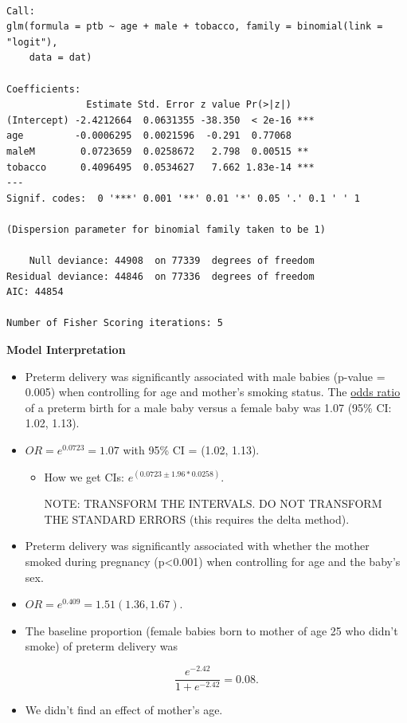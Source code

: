 \documentclass[
  letterpaper,
  DIV=11,
  numbers=noendperiod]{scrreprt}
\begin{document}
\begin{verbatim}

Call:
glm(formula = ptb ~ age + male + tobacco, family = binomial(link = "logit"), 
    data = dat)

Coefficients:
              Estimate Std. Error z value Pr(>|z|)    
(Intercept) -2.4212664  0.0631355 -38.350  < 2e-16 ***
age         -0.0006295  0.0021596  -0.291  0.77068    
maleM        0.0723659  0.0258672   2.798  0.00515 ** 
tobacco      0.4096495  0.0534627   7.662 1.83e-14 ***
---
Signif. codes:  0 '***' 0.001 '**' 0.01 '*' 0.05 '.' 0.1 ' ' 1

(Dispersion parameter for binomial family taken to be 1)

    Null deviance: 44908  on 77339  degrees of freedom
Residual deviance: 44846  on 77336  degrees of freedom
AIC: 44854

Number of Fisher Scoring iterations: 5
\end{verbatim}

\textbf{Model Interpretation}

\begin{itemize}
\item
  Preterm delivery was significantly associated with male babies
  (p-value = 0.005) when controlling for age and mother's smoking
  status. The \ul{odds ratio} of a preterm birth for a male baby versus
  a female baby was 1.07 (95\% CI: 1.02, 1.13).
\item
  \(OR = e^{0.0723} = 1.07\) with 95\% CI = (1.02, 1.13).

  \begin{itemize}
  \item
    How we get CIs: \(e^{(0.0723 \pm 1.96 * 0.0258)}\).

    NOTE: TRANSFORM THE INTERVALS. DO NOT TRANSFORM THE STANDARD ERRORS
    (this requires the delta method).
  \end{itemize}
\item
  Preterm delivery was significantly associated with whether the mother
  smoked during pregnancy (p\textless0.001) when controlling for age and
  the baby's sex.
\item
  \(OR = e^{0.409} = 1.51 (1.36, 1.67)\).
\item
  The baseline proportion (female babies born to mother of age 25 who
  didn't smoke) of preterm delivery was

  \[
  \frac{e^{-2.42}}{1 + e^{-2.42}} = 0.08.
  \]
\item
  We didn't find an effect of mother's age.
\end{itemize}
\end{document}
